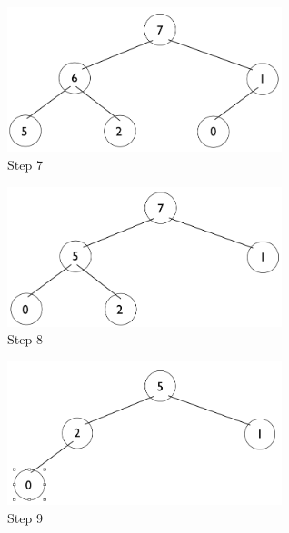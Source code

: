 \documentclass[11pt,letterpaper]{article}
\begin{document}
\begin{figure}[!ht]

	\begin{center}
	\includegraphics[width=80mm]{images/6_5_1_7_tree.png}
	\end{center}

\caption{Step 7 }
\end{figure}

\begin{figure}[!ht]

	\begin{center}
	\includegraphics[width=80mm]{images/6_5_1_8_tree.png}
	\end{center}

\caption{Step 8 }
\end{figure}

\pagebreak

\begin{figure}[!ht]

	\begin{center}
	\includegraphics[width=80mm]{images/6_5_1_9_tree.png}
	\end{center}

\caption{Step 9 }
\end{figure}
\end{document}
